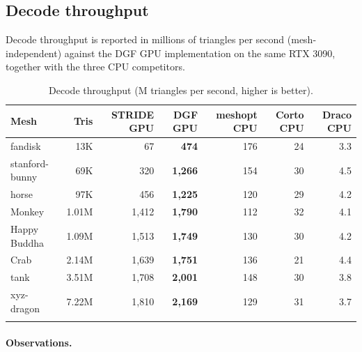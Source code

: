 \documentclass[pdflatex,sn-vancouver-num]{sn-jnl}%
\theoremstyle{thmstyleone}%
\theoremstyle{thmstyletwo}%
\theoremstyle{thmstylethree}%
\begin{document}
\subsection{Decode throughput}\label{sec:throughput}

Decode throughput is reported in millions of triangles per second (mesh-independent) against the DGF GPU implementation on the same RTX 3090, together with the three CPU competitors.

\begin{table}[ht]
\caption{Decode throughput (M triangles per second, higher is better).}\label{tab:tput}
\footnotesize
\begin{tabular*}{\textwidth}{@{\extracolsep\fill}lrrrrrr@{}}
\toprule
Mesh & Tris & \textbf{STRIDE GPU} & DGF GPU & meshopt CPU & Corto CPU & Draco CPU \\
\midrule
fandisk        & 13K   & 67    & \textbf{474}   & 176 & 24 & 3.3 \\
stanford-bunny & 69K   & 320   & \textbf{1{,}266} & 154 & 30 & 4.5 \\
horse          & 97K   & 456   & \textbf{1{,}225} & 120 & 29 & 4.2 \\
Monkey         & 1.01M & 1{,}412 & \textbf{1{,}790} & 112 & 32 & 4.1 \\
Happy Buddha   & 1.09M & 1{,}513 & \textbf{1{,}749} & 130 & 30 & 4.2 \\
Crab           & 2.14M & 1{,}639 & \textbf{1{,}751} & 136 & 21 & 4.4 \\
tank           & 3.51M & 1{,}708 & \textbf{2{,}001} & 148 & 30 & 3.8 \\
xyz-dragon     & 7.22M & 1{,}810 & \textbf{2{,}169} & 129 & 31 & 3.7 \\
\botrule
\end{tabular*}
\end{table}

\paragraph{Observations.}\mbox{}
\end{document}
